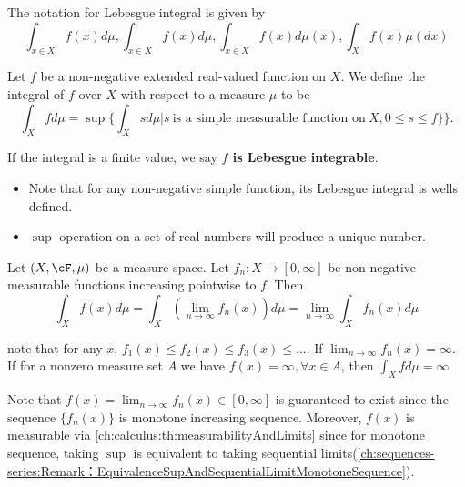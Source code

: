 \begin{refsection}
\begin{note}
	The notation for Lebesgue integral is given by
	$$\int_{x\in X} f(x)d\mu, \int_{x\in X} f(x)d\mu, \int_{x\in X} f(x)d\mu(x), \int_X f(x)\mu(dx)$$	
\end{note}




\begin{definition} Let $f$ be a non-negative extended real-valued function on $X$. We define the integral of $f$ over $X$ with respect to a measure $\mu$ to be
$$\int_X f d\mu =\sup\{ \int_X s d\mu | s~ \text{is a simple measurable function on} ~ X, 0 \leq s \leq f \} \}.$$

If the integral is a finite value, we say \textbf{$f$ is Lebesgue integrable}.
\end{definition}

\begin{remark}\hfill
\begin{itemize}
	\item Note that for any non-negative simple function, its Lebesgue integral is wells defined. 
	\item $\sup$ operation on a set of real numbers will produce a unique number.
\end{itemize}	
\end{remark}




\begin{theorem}\cite[25]{cheng2008crash}\label{ch:calculus:th:LebesgueMonotoneConvergenceTheorem}Let $(X,\cF,\mu)$ be a measure space. Let $f_n: X\to [0,\infty]$ be non-negative measurable functions increasing pointwise to $f$. Then
	$$\int_X f(x) d\mu = \int_X(\lim_{n\to \infty} f_n(x)) d\mu = \lim_{n\to\infty} \int_X f_n(x)d\mu$$
\end{theorem}


\begin{remark}
	note that for any $x$, $f_1(x) \leq f_2(x) \leq f_3(x) \leq ...$. If $\lim_{n\to\infty} f_n(x) = \infty$. If for a nonzero measure set $A$ we have $f(x) = \infty, \forall x\in A$, then $\int_X f d\mu = \infty$ 	
\end{remark}


\begin{remark}
	Note that $f(x) = \lim_{n\to \infty} f_n(x) \in [0,\infty]$ is guaranteed to exist since the sequence $\{f_n(x)\}$ is monotone increasing sequence. Moreover, $f(x)$ is measurable via \autoref{ch:calculus:th:measurabilityAndLimits} since for monotone sequence, taking $\sup$ is equivalent to taking sequential limits(\autoref{ch:sequences-series:Remark：EquivalenceSupAndSequentialLimitMonotoneSequence}).	
\end{remark}





\end{refsection}
